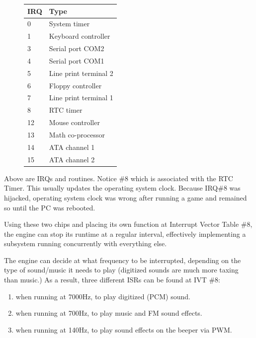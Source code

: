 \par
\begin{figure}[H]
\centering
\begin{tabularx}{\textwidth}{ X X  }
  \toprule
  \textbf{IRQ} & \textbf{Type} \\ \bottomrule
0 & System timer \\
1 & Keyboard controller \\
3 & Serial port COM2 \\ 
4 & Serial port COM1 \\
5 & Line print terminal 2 \\
6 & Floppy controller \\
7 & Line print terminal 1 \\
8 & RTC timer \\
12 & Mouse controller \\
13 & Math co-processor \\
14 & ATA channel 1 \\
15 & ATA channel 2  \\
\bottomrule
\end{tabularx}

\end{figure}
Above are IRQs and routines. Notice \#8 which is associated with the RTC Timer. This usually updates the operating system clock. Because IRQ\#8 was hijacked, operating system clock was wrong after running a game and remained so until the PC was rebooted.\\
\par
Using these two chips and placing its own function at Interrupt Vector Table \#8, the engine can stop its runtime at a regular interval, effectively implementing a subsystem running concurrently with everything else.\\
\par
The engine can decide at what frequency to be interrupted, depending on the type of sound/music it needs to play (digitized sounds are much more taxing than music.) As a result, three different ISRs can be found at IVT \#8: 
\begin{enumerate}
\item {} when running at 7000Hz, to play digitized (PCM) sound.
\item {} when running at 700Hz, to play music and FM sound effects.
\item {} when running at 140Hz, to play sound effects on the beeper via PWM.
\end{enumerate}
\par



